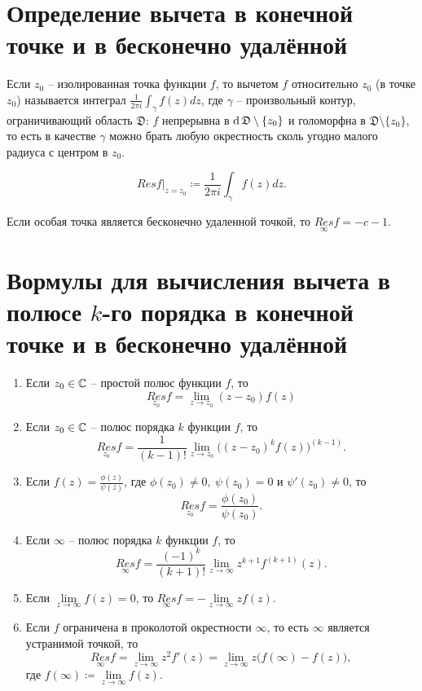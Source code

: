 \section{Определение вычета в конечной точке и в бесконечно удалённой}

\begin{definition}
	Если $z_0$ -- изолированная точка функции $f$, то вычетом $f$ относительно $z_0$ (в точке $z_0$) называется интеграл $\frac{1}{2\pi i}\int_{\gamma}f(z)dz$, где $\gamma$ -- произвольный контур, ограничивающий область $\mathfrak{D}$: $f$ непрерывна в $\operatorname{d} \mathfrak{D} \setminus \{z_0\}$ и голоморфна в $\mathfrak{D}\setminus \{z_0\}$, то есть в качестве $\gamma$ можно брать любую окрестность сколь угодно малого радиуса с центром в $z_0$.
	\begin{notation}
		\[
			Res f\Big|_{z=z_0} \coloneq \frac{1}{2\pi i}\int_{\gamma}f(z)dz.
		\]
	\end{notation}

	Если особая точка является бесконечно удаленной точкой, то $\underset{\infty}{Res}f = -c-1$.
\end{definition}

\section{Вормулы для вычисления вычета в полюсе $k$-го порядка в конечной точке и в бесконечно удалённой}

\begin{enumerate}
	\item Если $z_0 \in \mathbb{C}$ -- простой полюс функции $f$, то
	      \[
		      \underset{z_0}{Res}f = \underset{z \rightarrow z_0}{\lim}(z-z_0)f(z)
	      \]
	\item Если $z_0 \in \mathbb{C}$ -- полюс порядка $k$ функции $f$, то
	      \[
		      \underset{z_0}{Res}f = \frac{1}{(k-1)!}\underset{z \rightarrow z_0}{\lim}\big((z-z_0)^kf(z)\big)^{(k-1)}.
	      \]
	\item Если $f(z) = \frac{\phi(z)}{\psi(z)}$, где $\phi(z_0) \ne 0, \ \psi(z_0) = 0$ и $\psi'(z_0) \ne 0$, то
	      \[
		      \underset{z_0}{Res}f = \frac{\phi(z_0)}{\psi(z_0)}.
	      \]
	\item Если $\infty$ -- полюс порядка $k$ функции $f$, то
	      \[
		      \underset{\infty}{Res}f = \frac{(-1)^{k}}{(k+1)!}\underset{z \rightarrow \infty}{\lim}z^{k+1}f^{(k+1)}(z).
	      \]
	\item Если $\underset{z \rightarrow \infty}{\lim}f(z) = 0$, то $\underset{\infty}{Res}f = - \underset{z \rightarrow \infty}{\lim} z f(z)$.
	\item Если $f$ ограничена в проколотой окрестности $\infty$, то есть $\infty$ является устранимой точкой, то
	      \[
		      \underset{\infty}{Res}f = \underset{z \rightarrow \infty}{\lim}z^2 f'(z) = \underset{z \rightarrow \infty}{\lim}z \big(f(\infty) - f(z)\big),
	      \]
	      где $f(\infty)\coloneq \underset{z \rightarrow \infty}{\lim}f(z)$.
\end{enumerate}

